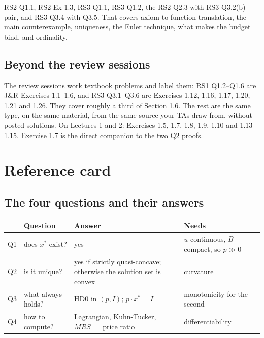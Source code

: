 \documentclass[11pt]{article}
\theoremstyle{definition}
\newcommand{\xs}{x^*}
\begin{document}
RS2 Q1.1, RS2 Ex 1.3, RS3 Q1.1, RS3 Q1.2, the RS2 Q2.3 with RS3 Q3.2(b) pair, and RS3 Q3.4
with Q3.5. That covers axiom-to-function translation, the main counterexample, uniqueness,
the Euler technique, what makes the budget bind, and ordinality.

\subsection{Beyond the review sessions}

The review sessions work textbook problems and label them: RS1 Q1.2--Q1.6 are J\&R
Exercises 1.1--1.6, and RS3 Q3.1--Q3.6 are Exercises 1.12, 1.16, 1.17, 1.20, 1.21 and 1.26.
They cover roughly a third of Section 1.6. The rest are the same type, on the same material,
from the same source your TAs draw from, without posted solutions. On Lectures 1 and 2:
Exercises 1.5, 1.7, 1.8, 1.9, 1.10 and 1.13--1.15. Exercise 1.7 is the direct companion to
the two Q2 proofs.

\clearpage

\section{Reference card}

\subsection{The four questions and their answers}

\begin{center}
\begin{tabular}{@{}p{0.6cm}p{4.3cm}p{4.4cm}p{4.7cm}@{}}
\toprule
& \textbf{Question} & \textbf{Answer} & \textbf{Needs} \\
\midrule
Q1 & does $\xs$ exist? & yes & $u$ continuous, $B$ compact, so $p\gg0$ \\[3pt]
Q2 & is it unique? & yes if strictly quasi-concave; otherwise the solution set is convex & curvature \\[3pt]
Q3 & what always holds? & HD0 in $(p,I)$; $p\cdot\xs=I$ & monotonicity for the second \\[3pt]
Q4 & how to compute? & Lagrangian, Kuhn-Tucker, $MRS=$ price ratio & differentiability \\
\bottomrule
\end{tabular}
\end{center}
\end{document}
